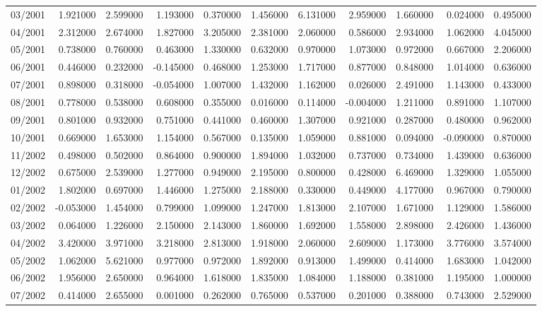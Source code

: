 \begin{tabular}{lrrrrrrrrrr}
03/2001 & 1.921000 & 2.599000 & 1.193000 & 0.370000 & 1.456000 & 6.131000 & 2.959000 & 1.660000 & 0.024000 & 0.495000 \\
04/2001 & 2.312000 & 2.674000 & 1.827000 & 3.205000 & 2.381000 & 2.060000 & 0.586000 & 2.934000 & 1.062000 & 4.045000 \\
05/2001 & 0.738000 & 0.760000 & 0.463000 & 1.330000 & 0.632000 & 0.970000 & 1.073000 & 0.972000 & 0.667000 & 2.206000 \\
06/2001 & 0.446000 & 0.232000 & -0.145000 & 0.468000 & 1.253000 & 1.717000 & 0.877000 & 0.848000 & 1.014000 & 0.636000 \\
07/2001 & 0.898000 & 0.318000 & -0.054000 & 1.007000 & 1.432000 & 1.162000 & 0.026000 & 2.491000 & 1.143000 & 0.433000 \\
08/2001 & 0.778000 & 0.538000 & 0.608000 & 0.355000 & 0.016000 & 0.114000 & -0.004000 & 1.211000 & 0.891000 & 1.107000 \\
09/2001 & 0.801000 & 0.932000 & 0.751000 & 0.441000 & 0.460000 & 1.307000 & 0.921000 & 0.287000 & 0.480000 & 0.962000 \\
10/2001 & 0.669000 & 1.653000 & 1.154000 & 0.567000 & 0.135000 & 1.059000 & 0.881000 & 0.094000 & -0.090000 & 0.870000 \\
11/2002 & 0.498000 & 0.502000 & 0.864000 & 0.900000 & 1.894000 & 1.032000 & 0.737000 & 0.734000 & 1.439000 & 0.636000 \\
12/2002 & 0.675000 & 2.539000 & 1.277000 & 0.949000 & 2.195000 & 0.800000 & 0.428000 & 6.469000 & 1.329000 & 1.055000 \\
01/2002 & 1.802000 & 0.697000 & 1.446000 & 1.275000 & 2.188000 & 0.330000 & 0.449000 & 4.177000 & 0.967000 & 0.790000 \\
02/2002 & -0.053000 & 1.454000 & 0.799000 & 1.099000 & 1.247000 & 1.813000 & 2.107000 & 1.671000 & 1.129000 & 1.586000 \\
03/2002 & 0.064000 & 1.226000 & 2.150000 & 2.143000 & 1.860000 & 1.692000 & 1.558000 & 2.898000 & 2.426000 & 1.436000 \\
04/2002 & 3.420000 & 3.971000 & 3.218000 & 2.813000 & 1.918000 & 2.060000 & 2.609000 & 1.173000 & 3.776000 & 3.574000 \\
05/2002 & 1.062000 & 5.621000 & 0.977000 & 0.972000 & 1.892000 & 0.913000 & 1.499000 & 0.414000 & 1.683000 & 1.042000 \\
06/2002 & 1.956000 & 2.650000 & 0.964000 & 1.618000 & 1.835000 & 1.084000 & 1.188000 & 0.381000 & 1.195000 & 1.000000 \\
07/2002 & 0.414000 & 2.655000 & 0.001000 & 0.262000 & 0.765000 & 0.537000 & 0.201000 & 0.388000 & 0.743000 & 2.529000 \\

\end{tabular}
